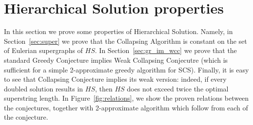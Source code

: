\section{Hierarchical Solution properties}
In this section we prove some properties of Hierarchical Solution. Namely, in Section~\ref{sec:super} we prove that the Collapsing Algorithm is constant on the set of Eulerian supergraphs of $HS$. In Section~\ref{sec:gr_im_wcc} we prove that the standard Greedy Conjecture implies Weak Collapsing Conjecutre (which is sufficient for a simple 2-approximate greedy algorithm for SCS). Finally, it is easy to see that Collapsing Conjecture implies its weak version: indeed, if every doubled solution results in $HS$, then $HS$ does not exceed twice the optimal superstring length. In Figure~\ref{fig:relations}, we show the proven relations between the conjectures, together with 2-approximate algorithm which follow from each of the conjecture.

